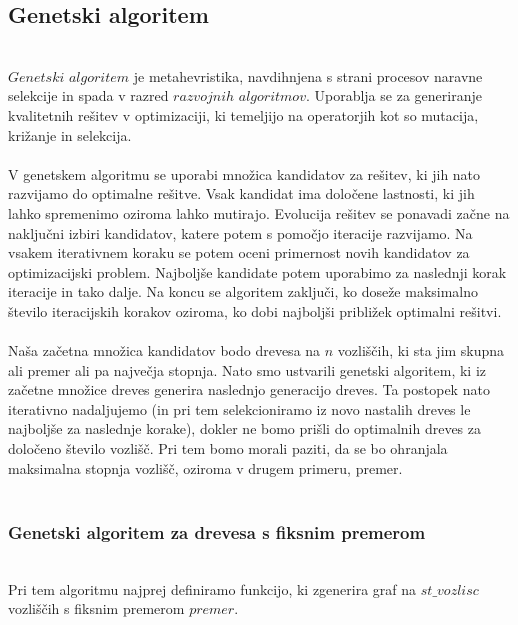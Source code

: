 \documentclass[12pt,a4paper]{amsart}
\theoremstyle{definition} %
\theoremstyle{plain} %
\begin{document}
\subsection{Genetski algoritem}
\
\\
$Genetski$ $algoritem$ je metahevristika, navdihnjena s strani procesov naravne selekcije in spada v razred $razvojnih$
$algoritmov$. Uporablja se za generiranje kvalitetnih rešitev v optimizaciji, ki temeljijo na operatorjih kot so mutacija, križanje
in selekcija.  
\\
\\
V genetskem algoritmu se uporabi množica kandidatov za rešitev, ki jih nato razvijamo do optimalne rešitve. Vsak kandidat
ima določene lastnosti, ki jih lahko spremenimo oziroma lahko mutirajo. Evolucija rešitev se ponavadi začne na naključni izbiri kandidatov,
katere potem s pomočjo iteracije razvijamo. Na vsakem iterativnem koraku se potem oceni primernost novih kandidatov za optimizacijski
problem. Najboljše kandidate potem uporabimo za naslednji korak iteracije in tako dalje. Na koncu se algoritem zaključi,
ko doseže maksimalno število iteracijskih korakov oziroma, ko dobi najboljši približek optimalni rešitvi.
\\
\\
Naša začetna množica kandidatov bodo drevesa na $n$ vozliščih, ki sta jim skupna ali premer ali pa največja stopnja. 
Nato smo ustvarili genetski algoritem, ki iz začetne množice dreves generira naslednjo generacijo dreves. Ta postopek nato iterativno
nadaljujemo (in pri tem selekcioniramo iz novo nastalih dreves le najboljše za naslednje korake), dokler ne bomo prišli do optimalnih 
dreves za določeno število vozlišč. Pri tem bomo morali paziti, da se bo ohranjala maksimalna stopnja vozlišč, 
oziroma v drugem primeru, premer.
\\
\\
\subsubsection{Genetski algoritem za drevesa s fiksnim premerom}
\
\\
Pri tem algoritmu najprej definiramo funkcijo, ki zgenerira graf na $st\_vozlisc$ vozliščih s fiksnim premerom $premer$.
\end{document}
